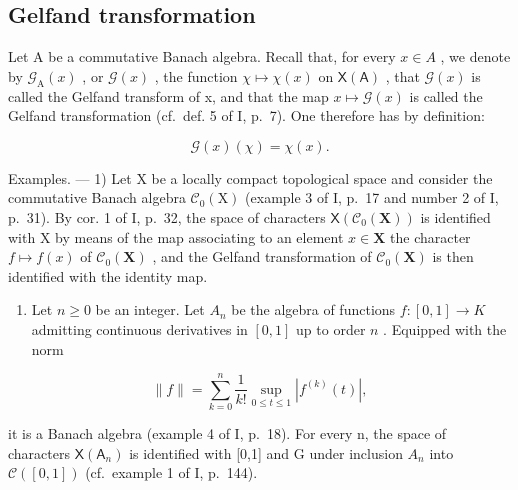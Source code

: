 \subsection{Gelfand transformation}

Let A be a commutative Banach algebra. Recall that, for every \(x \in A\) , we denote by \(\mathcal{G}_{\mathrm{A}}(x)\) , or \(\mathcal{G}(x)\) , the function \(\chi \mapsto \chi(x)\) on \(\mathsf{X}(\mathsf{A})\) , that \(\mathcal{G}(x)\) is called the Gelfand transform of x, and that the map \(x \mapsto \mathcal{G}(x)\) is called the Gelfand transformation (cf.~def. 5 of I, p.~7). One therefore has by definition:

\[
\mathcal {G} (x) (\chi) = \chi (x).
\]

Examples. --- 1) Let X be a locally compact topological space and consider the commutative Banach algebra \(\mathcal{C}_{0}(\mathrm{X})\) (example 3 of I, p.~17 and number 2 of I, p.~31). By cor. 1 of I, p.~32, the space of characters \(\mathsf{X}(\mathcal{C}_{0}(\mathbf{X}))\) is identified with X by means of the map associating to an element \(x \in \mathbf{X}\) the character \(f \mapsto f(x)\) of \(\mathcal{C}_{0}(\mathbf{X})\) , and the Gelfand transformation of \(\mathcal{C}_{0}(\mathbf{X})\) is then identified with the identity map.

\begin{enumerate}
\def\labelenumi{\arabic{enumi})}
\setcounter{enumi}{1}
\tightlist
\item
  Let \(n \geqslant 0\) be an integer. Let \(A_n\) be the algebra of functions \(f: [0,1] \to K\) admitting continuous derivatives in \([0,1]\) up to order \(n\) . Equipped with the norm
\end{enumerate}

\[
\| f \| = \sum_ {k = 0} ^ {n} \frac {1}{k !} \sup _ {0 \leqslant t \leqslant 1} | f ^ {(k)} (t) |,
\]

it is a Banach algebra (example 4 of I, p.~18). For every n, the space of characters \(\mathsf{X}(\mathsf{A}_{n})\) is identified with {[}0,1{]} and G under inclusion \(A_{n}\) into \(\mathcal{C}([0,1])\) (cf.~example 1 of I, p.~144).


